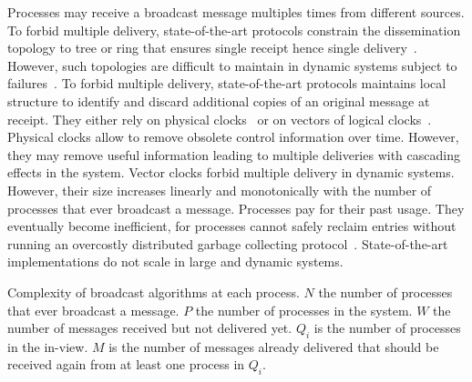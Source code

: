Processes may receive a broadcast message multiples times from different
sources.  To forbid multiple delivery, state-of-the-art protocols constrain the
dissemination topology to tree or ring that ensures single receipt hence single
delivery~\cite{bravo2017saturn,raynal2013distributed}. However, such topologies
are difficult to maintain in dynamic systems subject to
failures~\cite{krasikova2016hashtable}. To forbid multiple delivery,
state-of-the-art protocols maintains local structure to identify and discard
additional copies of an original message at receipt. They either rely on
physical clocks~\cite{cachin2011introduction,demers1987epidemic} or on vectors
of logical clocks~\cite{malkhi2007concise,mukund2014optimized}. Physical clocks
allow to remove obsolete control information over time. However, they may remove
useful information leading to multiple deliveries with cascading effects in the
system. Vector clocks forbid multiple delivery in dynamic systems. However,
their size increases linearly and monotonically with the number of processes
that ever broadcast a message. Processes pay for their past usage. They
eventually become inefficient, for processes cannot safely reclaim entries
without running an overcostly distributed garbage collecting
protocol~\cite{abdullahi1998garbage}. State-of-the-art implementations do not
scale in large and dynamic systems.




\begin{table}
  \begin{center}
    \caption{\label{table:complexity} Complexity of broadcast algorithms at each
      process. $N$ the number of processes that ever broadcast a message. $P$
      the number of processes in the system. $W$ the number of messages received
      but not delivered yet. $Q_i$ is the number of processes in the in-view. $M$
      is the number of messages already delivered that should be received again
      from at least one process in $Q_i$.}
    
  \end{center}
\end{table}

